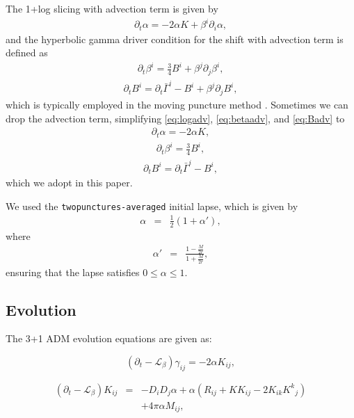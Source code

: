 \documentclass[]{article}
\begin{document}
The 1+log slicing with advection term is given by
\begin{eqnarray}
	\label{eq:logadv}
	\partial_t \alpha = -2\alpha K + \beta^i \partial_i \alpha,
\end{eqnarray}
and the hyperbolic gamma driver condition for the shift with advection term is defined as
\begin{eqnarray}
	\label{eq:betaadv}
	\partial_t \beta^i = \frac{3}{4}B^i + \beta^j\partial_j \beta^i,
\end{eqnarray}
\begin{eqnarray}
	\label{eq:Badv}
	\partial_t B^i = \partial_t \bar{\Gamma}^i -B^i + \beta^j \partial_j B^i,
\end{eqnarray}
which is typically employed in the moving puncture method \cite{Campanelli:2005dd, Alcubierre:2002kk}. Sometimes we can drop the advection term, simplifying \eqref{eq:logadv}, \eqref{eq:betaadv}, and \eqref{eq:Badv} to
\begin{eqnarray}
	\label{eq:lognoadv}
	\partial_t \alpha = -2\alpha K,
\end{eqnarray}
\begin{eqnarray}
	\label{eq:betanoadv}
	\partial_t \beta^i = \frac{3}{4}B^i,
\end{eqnarray}
\begin{eqnarray}
	\label{eq:Bnoadv}
	\partial_t B^i = \partial_t \bar{\Gamma}^i -B^i,
\end{eqnarray}
which we adopt in this paper.

We used the \texttt{twopunctures-averaged} initial lapse, which is given by
\begin{eqnarray}
	\alpha &=& \frac{1}{2}(1 + \alpha'),
\end{eqnarray}
where
\begin{eqnarray}
	\alpha' &=& \frac{1 - \frac{M}{2r}}{1 + \frac{M}{2r}},
\end{eqnarray}
ensuring that the lapse satisfies $0 \le \alpha \le 1$.

\subsection{Evolution}

The 3+1 ADM evolution equations are given as:

\begin{equation}
	(\partial_t - \mathcal{L}_\beta)\gamma_{ij} = -2\alpha K_{ij},
\end{equation}

\begin{eqnarray}
	(\partial_t - \mathcal{L}_\beta)K_{ij} &=& -D_i D_j \alpha + \alpha (R_{ij} + KK_{ij}-2K_{ik}K^k{}_{j})\nonumber\\&&+4\pi \alpha M_{ij},
\end{eqnarray}
\end{document}
